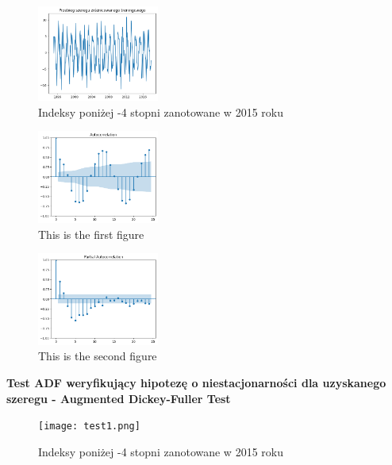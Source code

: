 \documentclass[12pt]{mwart}
\begin{document}
\begin{minipage}{\linewidth}
	\centering
	\begin{minipage}{0.45\linewidth}
		\begin{figure}[H]
			\includegraphics[width=4cm]{nowe.png}
			\caption{Indeksy poniżej -4 stopni zanotowane w 2015 roku}
		\end{figure}
	\end{minipage}
	\hspace{0.05\linewidth}
	\begin{minipage}{0.45\linewidth}
		\begin{figure}[H]
			\includegraphics[width=4cm]{acf1.png}
			\caption{This is the first figure}
		\end{figure}
	\end{minipage}
	\hspace{0.05\linewidth}
	\begin{minipage}{0.45\linewidth}
		\begin{figure}[H]
			\includegraphics[width=4cm]{pacf1.png}
			\caption{This is the second figure}
		\end{figure}
	\end{minipage}
\end{minipage}

\textbf{Test ADF weryfikujący hipotezę o niestacjonarności dla uzyskanego szeregu - Augmented Dickey-Fuller Test}

\begin{figure}[h]
	
	\texttt{[image: test1.png]}
	\caption{Indeksy poniżej -4 stopni zanotowane w 2015 roku}
\end{figure}
\end{document}
